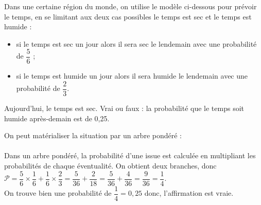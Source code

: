 \begin{exercice}[CRPE 2014c G1]
   Dans une certaine région du monde, on utilise le modèle ci-dessous pour prévoir le temps, en se limitant aux deux cas possibles \og le temps est sec \fg{} et \og le temps est humide \fg{} :
   \begin{itemize}
      \item si le temps est sec un jour alors il sera sec le lendemain avec une probabilité de $\dfrac56$ ;
      \item si le temps est humide un jour alors il sera humide le lendemain avec une probabilité de $\dfrac23$.
   \end{itemize}
   Aujourd'hui, le temps est sec. Vrai ou faux : la probabilité que le temps soit humide après-demain est de 0,25.
\end{exercice}

\begin{corrige} 
   On peut matérialiser la situation par un arbre pondéré : \\ [7mm]
   \hspace*{3cm}
   {} \\ [7mm]  
      Dans un arbre pondéré, la probabilité d'une issue est calculée en multipliant les probabilités de chaque éventualité. On obtient deux branches, donc \\ [2mm]
      $\mathcal{P} =\dfrac56\times\dfrac16+\dfrac16\times\dfrac23 =\dfrac{5}{36}+\dfrac{2}{18} =\dfrac{5}{36}+\dfrac{4}{36} =\dfrac{9}{36} =\dfrac14$. \\ [2mm]
      On trouve bien une probabilité de $\dfrac14 =0,25$ donc, {\blue l'affirmation est vraie}.
\end{corrige}

\bigskip


